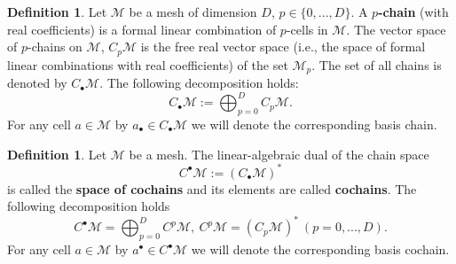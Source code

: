 \documentclass{elsarticle}
\theoremstyle{definition}
\newtheorem{definition}[theorem]{Definition}
\newcommand{\newterm}[1]{\textbf{#1}}
\begin{document}
\begin{definition}
  Let $\mathcal{M}$ be a mesh of dimension $D$, $p \in \{0, ..., D\}$.
  A \newterm{$p$-chain} (with real coefficients) is a formal linear combination of $p$-cells in $\mathcal{M}$.
  The vector space of $p$-chains on $\mathcal{M}$, $C_p \mathcal{M}$ is the free real vector space (i.e., the space of formal linear combinations with real coefficients) of the set $\mathcal{M}_p$.
  The set of all chains is denoted by $C_\bullet \mathcal{M}$.
  The following decomposition holds:
  \begin{equation}
    C_\bullet \mathcal{M} := \bigoplus_{p = 0}^D C_p \mathcal{M}.
  \end{equation}
  For any cell $a \in \mathcal{M}$ by $a_\bullet \in C_\bullet \mathcal{M}$ we will denote the corresponding basis chain.
\end{definition}
\begin{definition}
  Let $\mathcal{M}$ be a mesh.
  The linear-algebraic dual of the chain space
  \begin{equation}
    C^\bullet \mathcal{M} := (C_\bullet \mathcal{M})^*
  \end{equation}
  is called the \newterm{space of cochains} and its elements are called \newterm{cochains}.
  The following decomposition holds
  \begin{equation}
    C^\bullet \mathcal{M} = \bigoplus_{p = 0}^D C^p \mathcal{M},\ C^p \mathcal{M} = (C_p \mathcal{M})^*\ (p = 0, ..., D).
  \end{equation}
  For any cell $a \in \mathcal{M}$ by $a^\bullet \in C^\bullet \mathcal{M}$ we will denote the corresponding basis cochain.
\end{definition}
\end{document}

